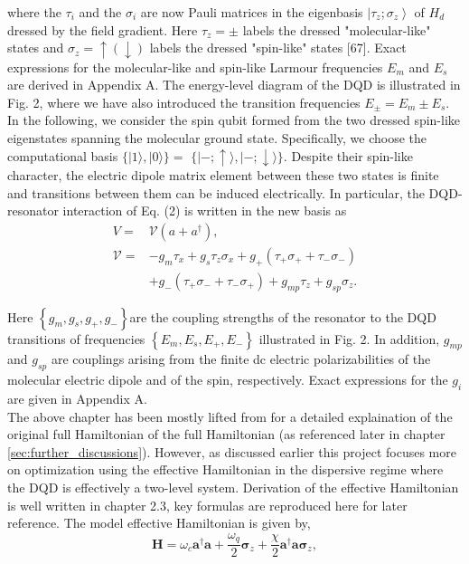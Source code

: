 \documentclass[12pt]{report}
\begin{document}
where the $\tau_i$ and the $\sigma_i$ are now Pauli matrices in the eigenbasis $\left|\tau_z ; \sigma_z\right\rangle$ of $H_d$ dressed by the field gradient. 
Here $\tau_z= \pm$ labels the dressed "molecular-like" states and $\sigma_z=\uparrow(\downarrow)$ labels the dressed "spin-like" states [67]. 
Exact expressions for the molecular-like and spin-like Larmour frequencies $E_m$ and $E_s$ are derived in \cite{D_Anjou_2019} Appendix A. The energy-level diagram of the DQD is illustrated in Fig. 2, where we have also introduced the transition frequencies $E_{ \pm}=E_m \pm E_s$. 
In the following, we consider the spin qubit formed from the two dressed spin-like eigenstates spanning the molecular ground state. 
Specifically, we choose the computational basis $\{|1\rangle,|0\rangle\}=$ $\{|-; \uparrow\rangle,|-; \downarrow\rangle\}$. 
Despite their spin-like character, the electric dipole matrix element between these two states is finite and transitions between them can be induced electrically. 
In particular, the DQD-resonator interaction of Eq. (2) is written in the new basis as
\begin{equation}\label{eq:DQD_resonator_interaction_new_basis}
    \begin{aligned}
        V= & \mathcal{V}\left(a+a^{\dagger}\right), \\
        \mathcal{V}= & -g_m \tau_x+g_s \tau_z \sigma_x+g_{+}\left(\tau_{+} \sigma_{+}+\tau_{-} \sigma_{-}\right) \\
        & +g_{-}\left(\tau_{+} \sigma_{-}+\tau_{-} \sigma_{+}\right)+g_{m p} \tau_z+g_{s p} \sigma_z .
        \end{aligned}    
\end{equation}

Here $\left\{g_m, g_s, g_{+}, g_{-}\right\}$are the coupling strengths of the resonator to the DQD transitions of frequencies $\left\{E_m, E_s, E_{+}, E_{-}\right\}$ illustrated in Fig. 2. 
In addition, $g_{m p}$ and $g_{s p}$ are couplings arising from the finite dc electric polarizabilities of the molecular electric dipole and of the spin, respectively. 
Exact expressions for the $g_i$ are given in \cite{D_Anjou_2019} Appendix A.
\\
The above chapter has been mostly lifted from \cite{D_Anjou_2019} for a detailed explaination of the original full Hamiltonian
of the full Hamiltonian (as referenced later in chapter \ref{sec:further_discussions}).
However, as discussed earlier this project focuses more on optimization using the effective Hamiltonian in the dispersive regime where the DQD is effectively a two-level system. 
Derivation of the effective Hamiltonian is well written in \cite{reinhold2019} chapter 2.3, key formulas are reproduced here for later reference. 
The model effective Hamiltonian is given by, 
\begin{equation}\label{eq:effective_Hamiltonian}
    \boldsymbol{H}=\omega_c \boldsymbol{a}^{\dagger} \boldsymbol{a}+\frac{\omega_q}{2} \boldsymbol{\sigma}_z+\frac{\chi}{2} \boldsymbol{a}^{\dagger} \boldsymbol{a} \boldsymbol{\sigma}_z,    
\end{equation}
\end{document}
